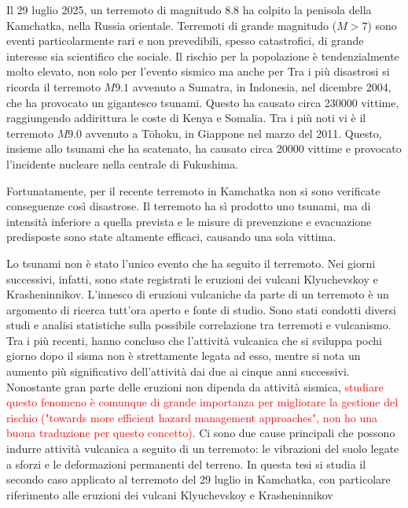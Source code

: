 



Il 29 luglio 2025, un terremoto di magnitudo \qty{8.8}{} ha colpito la penisola della Kamchatka, nella Russia orientale.
Terremoti di grande magnitudo (\(M>7\)) sono eventi particolarmente rari e non prevedibili, spesso catastrofici, di grande interesse sia scientifico che sociale. Il rischio per la popolazione è tendenzialmente molto elevato, non solo per l'evento sismico ma anche per  Tra i più disastrosi si ricorda il terremoto \(M9.1\) avvenuto a Sumatra, in Indonesia, nel dicembre 2004, che ha provocato un gigantesco tsunami. Questo ha causato circa \qty{230000}{} vittime, raggiungendo addirittura le coste di Kenya e Somalia. Tra i più noti vi è il terremoto \(M9.0\) avvenuto a Tōhoku, in Giappone nel marzo del 2011. Questo, insieme allo tsunami che ha scatenato, ha causato circa \qty{20000}{} vittime e provocato l'incidente nucleare nella centrale di Fukushima.

Fortunatamente, per il recente terremoto in Kamchatka non si sono verificate conseguenze così disastrose. Il terremoto ha sì prodotto uno tsunami, ma di intensità inferiore a quella prevista e le misure di prevenzione e evacuazione predisposte sono state altamente efficaci, causando una sola vittima.

Lo tsunami non è stato l'unico evento che ha seguito il terremoto. Nei giorni successivi, infatti, sono state registrati le eruzioni dei vulcani Klyuchevskoy e Krasheninnikov. L'innesco di eruzioni vulcaniche da parte di un terremoto è un argomento di ricerca tutt'ora aperto e fonte di studio.
Sono stati condotti diversi studi e analisi statistiche sulla possibile correlazione tra terremoti e vulcanismo. Tra i più recenti, \citet{Sawi2018ShortTermEQVolcanism} hanno concluso che l'attività vulcanica che si sviluppa pochi giorno dopo il sisma non è strettamente legata ad esso, mentre si nota un aumento più significativo dell'attività dai due ai cinque anni successivi. 
Nonostante gran parte delle eruzioni non dipenda da attività sismica, \textcolor{red}{studiare questo fenomeno è comunque di grande importanza per migliorare la gestione del rischio \citep{Seropian2021EarthquakesVolcanoes} ("towards more efficient hazard management approaches", non ho una buona traduzione per questo concetto)}.
Ci sono due cause principali che possono indurre attività vulcanica a seguito di un terremoto: le vibrazioni del suolo legate a sforzi e le deformazioni permanenti del terreno.
In questa tesi si studia il secondo caso applicato al terremoto del 29 luglio in Kamchatka, con particolare riferimento alle eruzioni dei vulcani Klyuchevskoy e Krasheninnikov

